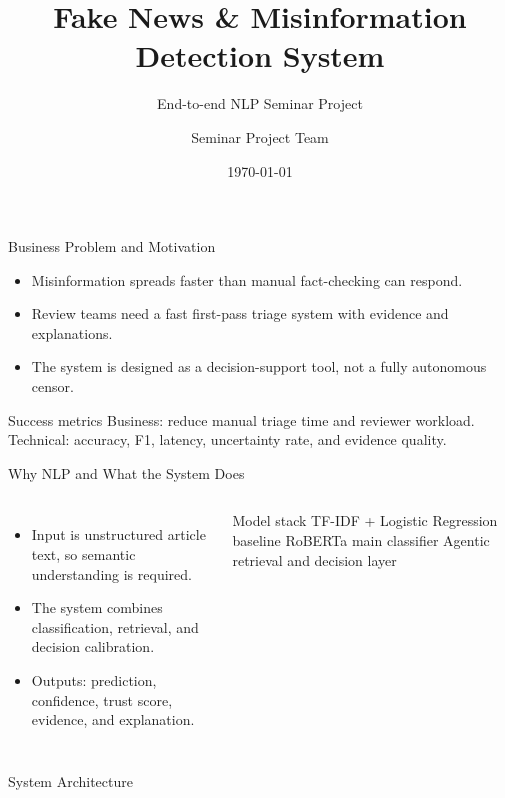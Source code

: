 \documentclass[aspectratio=169]{beamer}
\title[Fake News NLP System]{Fake News \& Misinformation Detection System}
\subtitle{End-to-end NLP Seminar Project}
\author{Seminar Project Team}
\institute{HCMUS}
\date{\today}
\begin{document}
\begin{frame}
  \titlepage
\end{frame}

\begin{frame}{Business Problem and Motivation}
  \begin{itemize}
    \item Misinformation spreads faster than manual fact-checking can respond.
    \item Review teams need a fast first-pass triage system with evidence and explanations.
    \item The system is designed as a decision-support tool, not a fully autonomous censor.
  \end{itemize}
  \begin{block}{Success metrics}
    Business: reduce manual triage time and reviewer workload. Technical: accuracy, F1, latency, uncertainty rate, and evidence quality.
  \end{block}
\end{frame}

\begin{frame}{Why NLP and What the System Does}
  \begin{columns}[T,onlytextwidth]
    \begin{itemize}
      \item Input is unstructured article text, so semantic understanding is required.
      \item The system combines classification, retrieval, and decision calibration.
      \item Outputs: prediction, confidence, trust score, evidence, and explanation.
    \end{itemize}
    \begin{block}{Model stack}
      TF-IDF + Logistic Regression baseline\newline
      RoBERTa main classifier\newline
      Agentic retrieval and decision layer
    \end{block}
  \end{columns}
\end{frame}

\begin{frame}{System Architecture}
\centering
{}
\end{frame}
\end{document}
